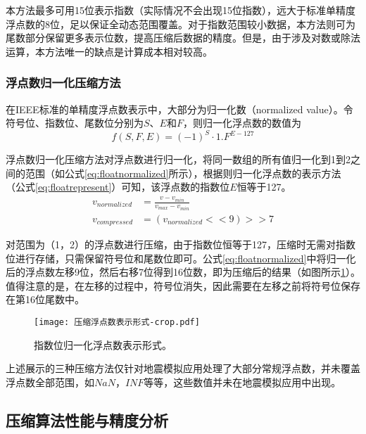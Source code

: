 本方法最多可用15位表示指数（实际情况不会出现15位指数），远大于标准单精度浮点数的8位，足以保证全动态范围覆盖。对于指数范围较小数据，本方法则可为尾数部分保留更多表示位数，提高压缩后数据的精度。但是，由于涉及对数或除法运算，本方法唯一的缺点是计算成本相对较高。

\subsubsection{浮点数归一化压缩方法}
在IEEE标准的单精度浮点数表示中，大部分为归一化数（normalized value）。令符号位、指数位、尾数位分别为$S$、$E$和$F$，则归一化浮点数的数值为
\begin{equation}
  f(S,F,E) = (-1)^S \cdot 1.F^{E-127}
\label{eq:floatrepresent}
\end{equation}

浮点数归一化压缩方法对浮点数进行归一化，将同一数组的所有值归一化到1到2之间的范围（如公式\ref{eq:floatnormalized}所示），根据则归一化浮点数的表示方法（公式\ref{eq:floatrepresent}）可知，该浮点数的指数位$E$恒等于127。
\begin{equation}
\begin{aligned}
  v_{normalized} &= \frac{v - v_{min}}{v_{max} - v_{min}} \\
  v_{compressed} &= (v_{normalized} << 9) >> 7
\end{aligned}
\label{eq:floatnormalized}
\end{equation}

对范围为（1，2）的浮点数进行压缩，由于指数位恒等于127，压缩时无需对指数位进行存储，只需保留符号位和尾数位即可。公式\ref{eq:floatnormalized}中将归一化后的浮点数左移9位，然后右移7位得到16位数，即为压缩后的结果（如图所示\ref{fig:ieeefloatnormalized}）。值得注意的是，在左移的过程中，符号位消失，因此需要在左移之前将符号位保存在第16位尾数中。

\begin{figure}[ht]
\centering
\texttt{[image: 压缩浮点数表示形式-crop.pdf]}
\caption{指数位归一化浮点数表示形式。}
\label{fig:ieeefloatnormalized}
\end{figure}

上述展示的三种压缩方法仅针对地震模拟应用处理了大部分常规浮点数，并未覆盖浮点数全部范围，如$NaN$，$INF$等等，这些数值并未在地震模拟应用中出现。

\subsection{压缩算法性能与精度分析}


